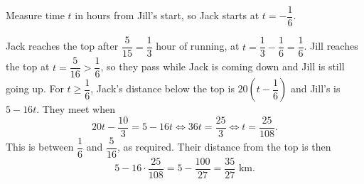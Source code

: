 Measure time $t$ in hours from Jill's start, so Jack starts at $t=-\dfrac{1}{6}$.

Jack reaches the top after $\dfrac{5}{15}=\dfrac{1}{3}$ hour of running, at $t=\dfrac{1}{3}-\dfrac{1}{6}=\dfrac{1}{6}$. Jill reaches the top at $t=\dfrac{5}{16}>\dfrac{1}{6}$, so they pass while Jack is coming down and Jill is still going up. For $t\ge\dfrac{1}{6}$, Jack's distance below the top is $20\left(t-\dfrac{1}{6}\right)$ and Jill's is $5-16t$. They meet when
\[
20t-\dfrac{10}{3}=5-16t\iff 36t=\dfrac{25}{3}\iff t=\dfrac{25}{108}.
\]
This is between $\dfrac{1}{6}$ and $\dfrac{5}{16}$, as required. Their distance from the top is then
\[
5-16\cdot\dfrac{25}{108}=5-\dfrac{100}{27}=\boxed{\dfrac{35}{27}\text{ km}}.
\]
